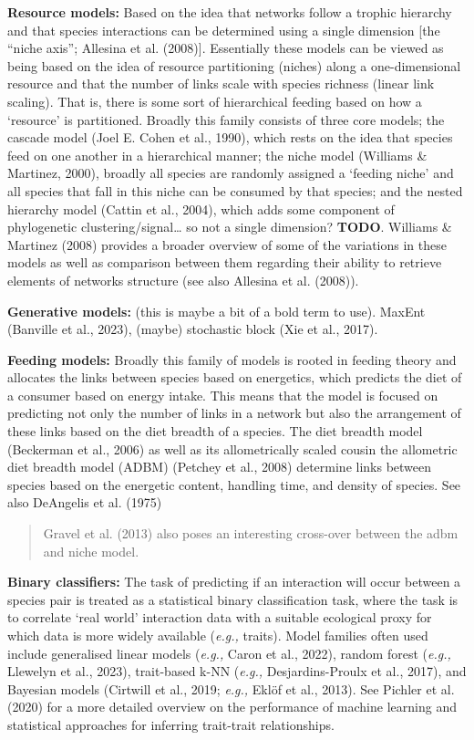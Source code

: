 \documentclass[
]{agujournal2019}
\begin{document}
\textbf{Resource models:} Based on the idea that networks follow a
trophic hierarchy and that species interactions can be determined using
a single dimension {[}the ``niche axis''; Allesina et al. (2008){]}.
Essentially these models can be viewed as being based on the idea of
resource partitioning (niches) along a one-dimensional resource and that
the number of links scale with species richness (linear link scaling).
That is, there is some sort of hierarchical feeding based on how a
`resource' is partitioned. Broadly this family consists of three core
models; the cascade model (Joel E. Cohen et al., 1990), which rests on
the idea that species feed on one another in a hierarchical manner; the
niche model (Williams \& Martinez, 2000), broadly all species are
randomly assigned a `feeding niche' and all species that fall in this
niche can be consumed by that species; and the nested hierarchy model
(Cattin et al., 2004), which adds some component of phylogenetic
clustering/signal\ldots{} so not a single dimension? \textbf{TODO}.
Williams \& Martinez (2008) provides a broader overview of some of the
variations in these models as well as comparison between them regarding
their ability to retrieve elements of networks structure (see also
Allesina et al. (2008)).

\textbf{Generative models:} (this is maybe a bit of a bold term to use).
MaxEnt (Banville et al., 2023), (maybe) stochastic block (Xie et al.,
2017).

\textbf{Feeding models:} Broadly this family of models is rooted in
feeding theory and allocates the links between species based on
energetics, which predicts the diet of a consumer based on energy
intake. This means that the model is focused on predicting not only the
number of links in a network but also the arrangement of these links
based on the diet breadth of a species. The diet breadth model
(Beckerman et al., 2006) as well as its allometrically scaled cousin the
allometric diet breadth model (ADBM) (Petchey et al., 2008) determine
links between species based on the energetic content, handling time, and
density of species. See also DeAngelis et al. (1975)

\begin{quote}
Gravel et al. (2013) also poses an interesting cross-over between the
adbm and niche model.
\end{quote}

\textbf{Binary classifiers:} The task of predicting if an interaction
will occur between a species pair is treated as a statistical binary
classification task, where the task is to correlate `real world'
interaction data with a suitable ecological proxy for which data is more
widely available (\emph{e.g.,} traits). Model families often used
include generalised linear models (\emph{e.g.,} Caron et al., 2022),
random forest (\emph{e.g.,} Llewelyn et al., 2023), trait-based k-NN
(\emph{e.g.,} Desjardins-Proulx et al., 2017), and Bayesian models
(Cirtwill et al., 2019; \emph{e.g.,} Eklöf et al., 2013). See Pichler et
al. (2020) for a more detailed overview on the performance of machine
learning and statistical approaches for inferring trait-trait
relationships.
\end{document}
